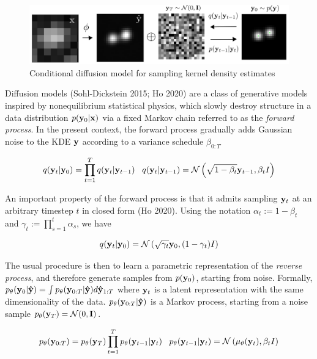 \documentclass{article}
\begin{document}
\begin{figure}
\includegraphics[scale=4.5]{Denoise.png}
\caption{Conditional diffusion model for sampling kernel density estimates}
\end{figure}

Diffusion models (Sohl-Dickstein 2015; Ho 2020) are a class of generative models inspired by nonequilibrium statistical physics, which slowly destroy structure in a data distribution $p(\bold{y}_{0}|\bold{x})$ via a fixed Markov chain referred to as the \emph{forward process}. In the present context, the forward process gradually adds Gaussian noise to the KDE $\bold{y}$ according to a variance schedule $\beta_{0:T}$

\begin{equation}
q(\bold{y}_{t}|\bold{y}_{0}) = \prod_{t=1}^{T}q(\bold{y}_{t}|\bold{y}_{t-1}) \;\;\; q(\bold{y}_{t}|\bold{y}_{t-1}) = \mathcal{N}\left(\sqrt{1-\beta_{t}}\bold{y}_{t-1},\beta_t I\right)
\end{equation}

An important property of the forward process is that it admits sampling $\bold{y}_t$ at an arbitrary timestep $t$ in closed form (Ho 2020). Using the notation $\alpha_t := 1 - \beta_t$ and $\gamma_t := \prod_{s=1}^{t} \alpha_s$, we have

\begin{equation}
q(\bold{y}_t|\bold{y}_0) = \mathcal{N} \left(\sqrt{\gamma_{t}} \bold{y}_{0}, (1 - \gamma_t)I \right)
\end{equation}


The usual procedure is then to learn a parametric representation of the \emph{reverse process}, and therefore generate samples from  $p(\bold{y}_{0})$, starting from noise. Formally, $p_{\theta}(\bold{y}_{0}|\bold{\hat{y}}) = \int p_{\theta}(\bold{y}_{0:T}|\bold{\hat{y}})d\bold{\hat{y}}_{1:T}$ where $\bold{y}_{t}$ is a latent representation with the same dimensionality of the data.  $p_{\theta}(\bold{y}_{0:T}|\bold{\hat{y}})$ is a Markov process, starting from a noise sample $p_{\theta}(\bold{y}_{T}) = \mathcal{N}(0,\bold{I})$. 

\begin{equation}
p_{\theta}(\bold{y}_{0:T}) = p_{\theta}(\bold{y}_{T})\prod_{t=1}^{T} p_{\theta}(\bold{y}_{t-1}|\bold{y}_{t}) \;\;\; p_{\theta}(\bold{y}_{t-1}|\bold{y}_{t}) = \mathcal{N}\left(\mu_{\theta}(\bold{y}_{t}),\beta_{t}I\right)
\end{equation}
\end{document}
